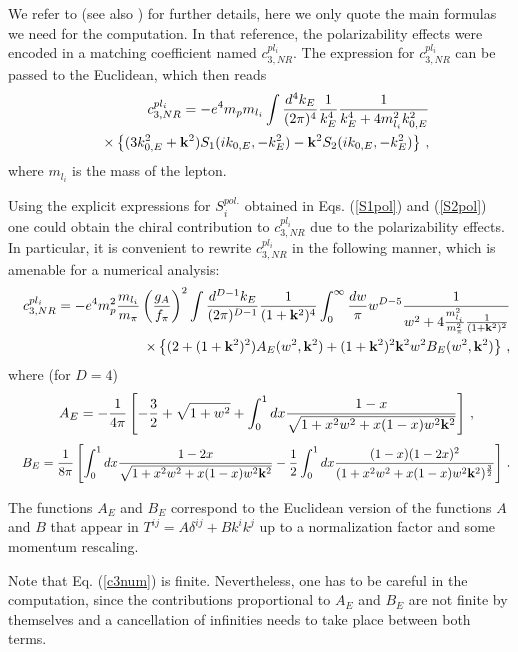 \documentclass[a4paper,12pt]{article}
\newcommand{\bea}{\begin{eqnarray}}
\newcommand{\eea}{\end{eqnarray}}
\newcommand{\nn}{\nonumber}
\begin{document}
We refer to \cite{Pineda:2004mx} (see also \cite{Pineda:2002as}) 
for further details, here we only quote the main formulas we need 
for the computation. In that reference, the polarizability effects were encoded in a matching coefficient
named $c_{3,NR}^{pl_i}$. The expression for $c_{3,NR}^{pl_i}$ can be passed to the Euclidean, which then reads
\bea
\label{c3}
&&
c_{3,NR}^{pl_i}=- e^4 m_pm_{l_i}\int {d^4k_E \over (2\pi)^4}{1 \over k_E^4}{1 \over
k_E^4+4m_{l_i}^2k_{0,E}^2 }
\\
\nn
&&
\times
\left\{
(3k_{0,E}^2+{\bf k}^2)S_1(ik_{0,E},-k_E^2)-{\bf k}^2S_2(ik_{0,E},-k_E^2)
\right\}
\,,
\eea
where $m_{l_i}$ is the mass of the lepton.

Using the explicit expressions for $S_{i}^{pol.}$ obtained in 
Eqs. (\ref{S1pol}) and (\ref{S2pol}) one could 
obtain the chiral contribution to $c_{3,NR}^{pl_i}$ due to the polarizability 
effects. In particular, it is convenient to rewrite $c_{3,NR}^{pl_i}$ 
in the following manner, which is amenable 
for a numerical analysis:
\bea
\label{c3num}
&&
c_{3,NR}^{pl_i}=- e^4 m_p^2\frac{m_{l_i}}{m_{\pi}}\left(\frac{g_A}{f_{\pi}}\right)^2
\int {d^{D-1}k_E \over (2\pi)^{D-1}}{1 \over (1+{\bf k}^2)^4}
\int_0^{\infty}\frac{dw}{\pi}w^{D-5}{1 \over
w^2+4\frac{m^2_{l_i}}{m_{\pi}^2}\frac{1}{(1+{\bf k}^2)^2}}
\nn
\\
&&
\times
\left\{
(2+(1+{\bf k}^2)^2)A_E(w^2,{\bf k}^2)+(1+{\bf k}^2)^2{\bf k}^2w^2B_E(w^2,{\bf k}^2)
\right\}
\,,
\eea
where (for $D=4$)
\bea
&&
A_E=-\frac{1}{4\pi}
\left[-\frac{3}{2}+\sqrt{1+w^2}
+\int_0^1dx\frac{1-x}{\sqrt{1+x^2w^2+x(1-x)w^2{\bf k}^2}}
\right]
\,,
\eea
\bea
\nn
&&
B_E=\frac{1}{8\pi}
\left[
\int_0^1dx\frac{1-2x}{\sqrt{1+x^2w^2+x(1-x)w^2{\bf k}^2}}
-
\frac{1}{2}\int_0^1dx\frac{(1-x)(1-2x)^2}{(1+x^2w^2+x(1-x)w^2{\bf k}^2)^{\frac{3}{2}}}
\right]
\,.
\eea

The functions $A_E$ and $B_E$ correspond to the Euclidean version of the 
functions $A$ and $B$ that appear in $T^{ij}=A\delta^{ij}+Bk^ik^j$ 
up to a normalization factor and some momentum rescaling. 

Note that Eq. (\ref{c3num}) is finite. Nevertheless, one has to be careful in 
the computation, since the contributions proportional to $A_E$ and $B_E$ are not 
finite by themselves and a cancellation of infinities needs to take place between 
both terms.
\end{document}

